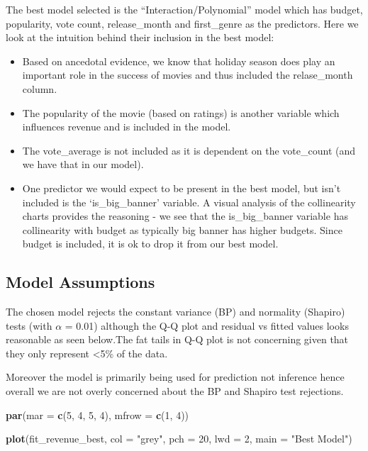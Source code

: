 \documentclass[
]{article}
\newenvironment{Shaded}{\begin{snugshade}}{\end{snugshade}}
\newcommand{\DataTypeTok}[1]{\textcolor[rgb]{0.13,0.29,0.53}{#1}}
\newcommand{\DecValTok}[1]{\textcolor[rgb]{0.00,0.00,0.81}{#1}}
\newcommand{\KeywordTok}[1]{\textcolor[rgb]{0.13,0.29,0.53}{\textbf{#1}}}
\newcommand{\NormalTok}[1]{#1}
\newcommand{\StringTok}[1]{\textcolor[rgb]{0.31,0.60,0.02}{#1}}
\providecommand{\tightlist}{%
  \setlength{\itemsep}{0pt}\setlength{\parskip}{0pt}}
\begin{document}
The best model selected is the ``Interaction/Polynomial'' model which
has budget, popularity, vote count, release\_month and first\_genre as
the predictors. Here we look at the intuition behind their inclusion in
the best model:

\begin{itemize}
\tightlist
\item
  Based on ancedotal evidence, we know that holiday season does play an
  important role in the success of movies and thus included the
  relase\_month column.
\item
  The popularity of the movie (based on ratings) is another variable
  which influences revenue and is included in the model.
\item
  The vote\_average is not included as it is dependent on the
  vote\_count (and we have that in our model).
\item
  One predictor we would expect to be present in the best model, but
  isn't included is the `is\_big\_banner' variable. A visual analysis of
  the collinearity charts provides the reasoning - we see that the
  is\_big\_banner variable has collinearity with budget as typically big
  banner has higher budgets. Since budget is included, it is ok to drop
  it from our best model.
\end{itemize}

\hypertarget{model-assumptions}{%
\subsection{Model Assumptions}\label{model-assumptions}}

The chosen model rejects the constant variance (BP) and normality
(Shapiro) tests (with \(\alpha\) = 0.01) although the Q-Q plot and
residual vs fitted values looks reasonable as seen below.The fat tails
in Q-Q plot is not concerning given that they only represent
\textless5\% of the data.

Moreover the model is primarily being used for prediction not inference
hence overall we are not overly concerned about the BP and Shapiro test
rejections.

\begin{Shaded}
\begin{Highlighting}[]
\KeywordTok{par}\NormalTok{(}\DataTypeTok{mar =} \KeywordTok{c}\NormalTok{(}\DecValTok{5}\NormalTok{, }\DecValTok{4}\NormalTok{, }\DecValTok{5}\NormalTok{, }\DecValTok{4}\NormalTok{), }\DataTypeTok{mfrow =} \KeywordTok{c}\NormalTok{(}\DecValTok{1}\NormalTok{, }\DecValTok{4}\NormalTok{))}

\KeywordTok{plot}\NormalTok{(fit_revenue_best,          }
     \DataTypeTok{col =} \StringTok{"grey"}\NormalTok{,}
     \DataTypeTok{pch =} \DecValTok{20}\NormalTok{,}
     \DataTypeTok{lwd =} \DecValTok{2}\NormalTok{,}
     \DataTypeTok{main =} \StringTok{"Best Model"}\NormalTok{)}
\end{Highlighting}
\end{Shaded}
\end{document}
